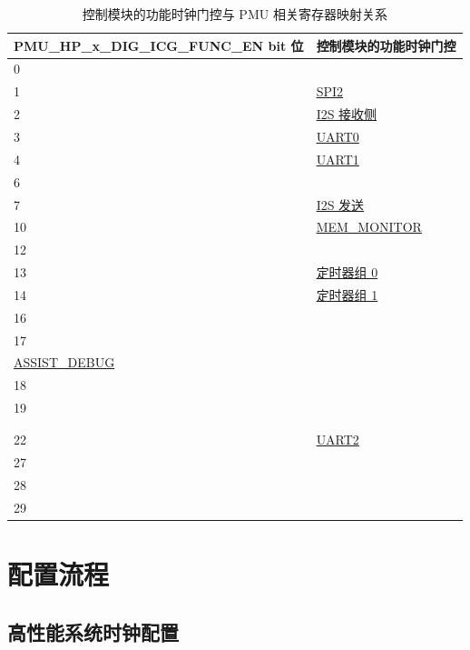 \documentclass[main\_\_CN.tex]{subfiles}
\begin{document}
\begin{table}[H]
    \centering
    \caption{控制模块的功能时钟门控与 PMU 相关寄存器映射关系}\label{tab:clk_pmu_func}
\begin{tabular}{|l|l|}
\hline
\rowcolor{lightgray}
\textbf{PMU\_HP\_x\_DIG\_ICG\_FUNC\_EN bit 位} & \textbf{控制模块的功能时钟门控} \\ \hline
0   & \nameref{mod:dma}\\ \hline
1   & \hyperref[mod:spi]{SPI2}\\ \hline
2   & \hyperref[mod:i2s]{I2S 接收侧}\\ \hline
3   & \hyperref[mod:uart]{UART0}\\ \hline
4   & \hyperref[mod:uart]{UART1}\\ \hline
6   & \nameref{mod:usbserialjtag}\\ \hline
7   & \hyperref[mod:i2s]{I2S 发送}\\ \hline
10  & \hyperref[mod:dbgassist]{MEM\_MONITOR}\\ \hline
12  & \nameref{mod:tmpsen}\\ \hline
13  & \hyperref[mod:timg]{定时器组 0}\\ \hline
14  & \hyperref[mod:timg]{定时器组 1}\\ \hline
16  & \nameref{mod:evntaskmatrix}\\ \hline
17  & \makecell[l]{\nameref{mod:riscvcpu}\\\hyperref[mod:dbgassist]{ASSIST\_DEBUG}}\\ \hline
18  & \nameref{mod:systimer}\\ \hline
19  & \makecell[l]{\nameref{mod:sha}\\\nameref{mod:ecc}\\\nameref{mod:ecdsa}}\\ \hline
22  & \hyperref[mod:uart]{UART2}\\ \hline
27  & \nameref{mod:ledpwm}   \\ \hline
28  & \nameref{mod:iomuxgpio}   \\ \hline
29  & \nameref{mod:i2c}   \\ \hline
\end{tabular}
\end{table}


\section{配置流程}
\label{sec:resclk-prog-procedures}

\subsection{高性能系统时钟配置}
\end{document}
